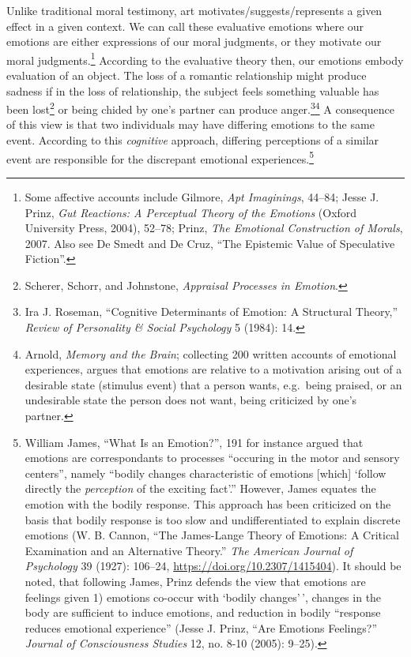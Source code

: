 \documentclass[phdthesis,12pt,final]{wuthesis}
\theoremstyle{definition}
\theoremstyle{definition}
\theoremstyle{definition}
\theoremstyle{definition}
\theoremstyle{remark}
\begin{document}
Unlike traditional moral testimony, art motivates/suggests/represents a given effect in a given context. We can call these evaluative emotions where our emotions are either expressions of our moral judgments, or they motivate our moral judgments.\footnote{Some affective accounts include Gilmore, \emph{Apt {Imaginings}}, 44--84; Jesse J. Prinz, \emph{Gut {Reactions}: {A Perceptual Theory} of the {Emotions}} (Oxford University Press, 2004), 52--78; Prinz, \emph{The {Emotional Construction} of {Morals}}, 2007. Also see De Smedt and De Cruz, {``The Epistemic Value of Speculative Fiction''}.} According to the evaluative theory then, our emotions embody evaluation of an object. The loss of a romantic relationship might produce sadness if in the loss of relationship, the subject feels something valuable has been lost\footnote{Scherer, Schorr, and Johnstone, \emph{Appraisal Processes in Emotion}.} or being chided by one's partner can produce anger.\footnote{Ira J. Roseman, {``Cognitive Determinants of Emotion: {A} Structural Theory,''} \emph{Review of Personality \& Social Psychology} 5 (1984): 14.}\footnote{Arnold, \emph{Memory and the Brain}; collecting 200 written accounts of emotional experiences, argues that emotions are relative to a motivation arising out of a desirable state (stimulus event) that a person wants, e.g.~being praised, or an undesirable state the person does not want, being criticized by one's partner.} A consequence of this view is that two individuals may have differing emotions to the same event. According to this \emph{cognitive} approach, differing perceptions of a similar event are responsible for the discrepant emotional experiences.\footnote{William James, {``What Is an Emotion?''}, 191 for instance argued that emotions are correspondants to processes ``occuring in the motor and sensory centers'', namely ``bodily changes characteristic of emotions {[}which{]} `follow directly the \emph{perception} of the exciting fact'.'' However, James equates the emotion with the bodily response. This approach has been criticized on the basis that bodily response is too slow and undifferentiated to explain discrete emotions (W. B. Cannon, {``The {James-Lange} Theory of Emotions: A Critical Examination and an Alternative Theory.''} \emph{The American Journal of Psychology} 39 (1927): 106--24, \url{https://doi.org/10.2307/1415404}). It should be noted, that following James, Prinz defends the view that emotions are feelings given 1) emotions co-occur with `bodily changes'\,', changes in the body are sufficient to induce emotions, and reduction in bodily ``response reduces emotional experience'' (Jesse J. Prinz, {``Are Emotions Feelings?''} \emph{Journal of Consciousness Studies} 12, no. 8-10 (2005): 9--25).}
\end{document}
